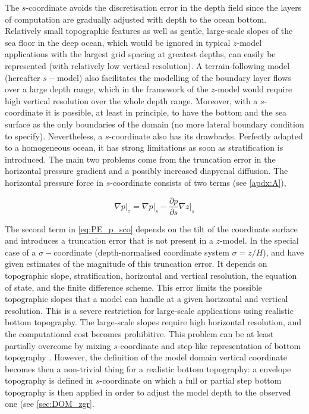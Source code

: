 \documentclass[../main/NEMO_manual]{subfiles}
\begin{document}
The $s$-coordinate avoids the discretisation error in the depth field since the layers of
computation are gradually adjusted with depth to the ocean bottom.
Relatively small topographic features as well as  gentle, large-scale slopes of the sea floor in the deep ocean,
which would be ignored in typical $z$-model applications with the largest grid spacing at greatest depths,
can easily be represented (with relatively low vertical resolution).
A terrain-following model (hereafter $s-$model) also facilitates the modelling of the boundary layer flows over
a large depth range, which in the framework of the $z$-model would require high vertical resolution over
the whole depth range.
Moreover, with a $s$-coordinate it is possible, at least in principle, to have the bottom and the sea surface as
the only boundaries of the domain (no more lateral boundary condition to specify).
Nevertheless, a $s$-coordinate also has its drawbacks. Perfectly adapted to a homogeneous ocean,
it has strong limitations as soon as stratification is introduced.
The main two problems come from the truncation error in the horizontal pressure gradient and
a possibly increased diapycnal diffusion.
The horizontal pressure force in $s$-coordinate consists of two terms (see \autoref{apdx:A}),

\begin{equation}
  \label{eq:PE_p_sco}
  \left. {\nabla p} \right|_z =\left. {\nabla p} \right|_s -\frac{\partial
    p}{\partial s}\left. {\nabla z} \right|_s 
\end{equation}

The second term in \autoref{eq:PE_p_sco} depends on the tilt of the coordinate surface and
introduces a truncation error that is not present in a $z$-model.
In the special case of a $\sigma-$coordinate (\ie depth-normalised coordinate system $\sigma = z/H$),
\citet{Haney1991} and \citet{Beckmann1993} have given estimates of the magnitude of this truncation error.
It depends on topographic slope, stratification, horizontal and vertical resolution, the equation of state,
and the finite difference scheme.
This error limits the possible topographic slopes that a model can handle at
a given horizontal and vertical resolution.
This is a severe restriction for large-scale applications using realistic bottom topography.
The large-scale slopes require high horizontal resolution, and the computational cost becomes prohibitive.
This problem can be at least partially overcome by mixing $s$-coordinate and
step-like representation of bottom topography \citep{Gerdes1993a,Gerdes1993b,Madec_al_JPO96}.
However, the definition of the model domain vertical coordinate becomes then a non-trivial thing for
a realistic bottom topography:
a envelope topography is defined in $s$-coordinate on which a full or
partial step bottom topography is then applied in order to adjust the model depth to the observed one
(see \autoref{sec:DOM_zgr}.
\end{document}
